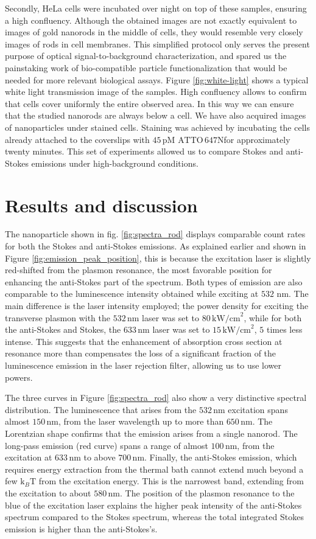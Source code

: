 \documentclass[journal=nalefd,manuscript=letter]{achemso}
\newcommand{\nm}{\ensuremath{\,\textrm{nm}}}
\newcommand{\pM}{\ensuremath{\,\textrm{pM}}}
\newcommand{\pwr}{\ensuremath{\,\textrm{kW/cm}^2}}
\newcommand{\atto}{\ensuremath{\textrm{ATTO}\,647\textrm{N}}}
\begin{document}
Secondly, HeLa cells were incubated over night on top of these samples, ensuring
a high confluency. Although the obtained images are not exactly equivalent to
images of gold nanorods in the middle of cells, they would resemble very closely
 images of rods in cell membranes. This simplified protocol only serves the
present purpose of optical signal-to-background characterization, and spared us
the painstaking work of bio-compatible particle functionalization that would be
needed for more relevant biological assays. Figure \ref{fig:white-light} shows a
typical white light transmission image of the samples. High confluency allows to
confirm that cells cover uniformly the entire observed area. In this way we can
ensure that the studied nanorods are always below a cell. We have also acquired
images of nanoparticles under stained cells. Staining was achieved by incubating
the cells already attached to the coverslips with $45\pM$ \atto for
approximately twenty minutes. This set of experiments allowed us to compare
Stokes and anti-Stokes emissions under high-background conditions.

\section{Results and discussion}

The nanoparticle shown in fig. \ref{fig:spectra_rod} displays comparable count
rates for both the Stokes and anti-Stokes emissions. As explained earlier and
shown in Figure \ref{fig:emission_peak_position}, this is because the excitation
laser is slightly red-shifted from the plasmon resonance, the most favorable
position for enhancing the anti-Stokes part of the spectrum. Both types of
emission are also comparable to the luminescence intensity obtained while
exciting at $532\,\nm$. The main difference is the laser intensity employed; the
power density for exciting the transverse plasmon with the $532\nm$ laser was
set to $80\pwr$, while for both the anti-Stokes and Stokes, the $633\nm$ laser
was set to $15\pwr$, $5$ times less intense. This suggests that the enhancement
of absorption cross section at resonance more than compensates the loss of a
significant fraction of the luminescence emission in the laser rejection filter,
allowing us to use lower powers.

The three curves in Figure \ref{fig:spectra_rod} also show a very distinctive
spectral distribution. The luminescence that arises from the $532\nm$ excitation
spans almost $150\nm$, from the laser wavelength up to more than $650\nm$. The
Lorentzian shape confirms that the emission arises from a single nanorod. The
long-pass emission (red curve) spans a range of almost $100\nm$, from the
excitation at $633\nm$ to above $700\nm$. Finally, the anti-Stokes emission,
which requires energy extraction from the thermal bath cannot extend much beyond
a few $\textrm{k}_{B}\textrm{T}$ from the excitation energy. This is the
narrowest band, extending from the excitation to about $580\nm$. The position of
the plasmon resonance to the blue of the excitation laser explains the higher
peak intensity of the anti-Stokes spectrum compared to the Stokes spectrum,
whereas the total integrated Stokes emission is higher than the anti-Stokes's.
\end{document}
